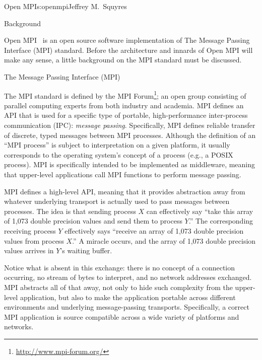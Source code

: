 \begin{aosachapter}{Open MPI}{s:openmpi}{Jeffrey M.\ Squyres}

\begin{aosasect1}{Background}

Open MPI~\cite{gabriel04:_open_mpi} is an open source software
implementation of The Message Passing Interface (MPI) standard.
%
Before the architecture and innards of Open MPI will make any sense,
a little background on the MPI standard must be discussed.


\begin{aosasect2}{The Message Passing Interface (MPI)}

The MPI standard is defined by the MPI
Forum\footnote{\url{http://www.mpi-forum.org/}}; an open group
consisting of parallel computing experts from both industry and
academia.
%
MPI defines an API that is used for a specific type of portable,
high-performance inter-process communication (IPC): {\em message
  passing}.  Specifically, MPI defines reliable transfer of discrete,
typed messages between MPI processes.
%
Although the definition of an ``MPI process'' is subject to
interpretation on a given platform, it usually corresponds to the
operating system's concept of a process (e.g., a POSIX process).
%
MPI is specifically intended to be implemented as middleware, meaning
that upper-level applications call MPI functions to perform message
passing.

MPI defines a high-level API, meaning that it provides abstraction
away from whatever underlying transport is actually used to pass
messages between processes.  The idea is that sending process $X$ can
effectively say ``take this array of 1,073 double precision values and
send them to process $Y$.''  The corresponding receiving process $Y$
effectively says ``receive an array of 1,073 double precision values
from process $X$.''  A miracle occurs, and the array of 1,073 double
precision values arrives in $Y$'s waiting buffer.

Notice what is absent in this exchange: there is no concept of a
connection occurring, no stream of bytes to interpret, and no network
addresses exchanged.  MPI abstracts all of that away, not only to hide
such complexity from the upper-level application, but also to make the
application portable across different environments and underlying
message-passing transports.  Specifically, a correct MPI application
is source compatible across a wide variety of platforms and networks.


\end{aosasect2}
\end{aosasect1}
\end{aosachapter}
